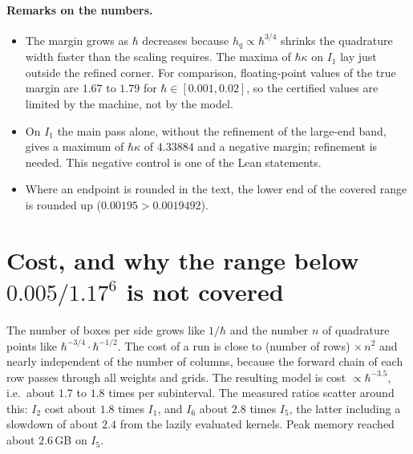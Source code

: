 \documentclass[11pt,a4paper]{article}
\theoremstyle{definition}
\theoremstyle{remark}
\newcommand{\hk}{\hbar\kappa}
\begin{document}
\paragraph{Remarks on the numbers.}
\begin{itemize}[leftmargin=2em]
\item The margin grows as $\hbar$ decreases because $h_q\propto\hbar^{3/4}$ shrinks the quadrature width faster than the scaling requires. The maxima of $\hk$ on $I_1$ lay just outside the refined corner. For comparison, floating-point values of the true margin are $1.67$ to $1.79$ for $\hbar\in[0.001,0.02]$, so the certified values are limited by the machine, not by the model.
\item On $I_1$ the main pass alone, without the refinement of the large-end band, gives a maximum of $\hk$ of $4.33884$ and a negative margin; refinement is needed. This negative control is one of the Lean statements.
\item Where an endpoint is rounded in the text, the lower end of the covered range is rounded up ($0.00195>0.0019492$).
\end{itemize}

\section{Cost, and why the range below \texorpdfstring{$0.005/1.17^6$}{0.005/1.17\^{}6} is not covered}\label{sec:cost}

The number of boxes per side grows like $1/\hbar$ and the number $n$ of quadrature points like $\hbar^{-3/4}\cdot\hbar^{-1/2}$. The cost of a run is close to (number of rows)$\,\times n^2$ and nearly independent of the number of columns, because the forward chain of each row passes through all weights and grids. The resulting model is cost $\propto\hbar^{-3.5}$, i.e.\ about $1.7$ to $1.8$ times per subinterval. The measured ratios scatter around this: $I_2$ cost about $1.8$ times $I_1$, and $I_6$ about $2.8$ times $I_5$, the latter including a slowdown of about $2.4$ from the lazily evaluated kernels. Peak memory reached about $2.6$\,GB on $I_5$.
\end{document}
